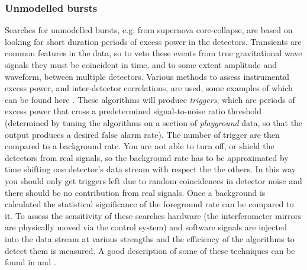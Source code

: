 \documentclass{article}
\begin{document}
\subsubsection{Unmodelled bursts}\label{subsubsection:unmodelled}
Searches for unmodelled bursts, e.g. from supernova core-collapse, are based on
looking for short duration periods of excess power in the detectors. Transients
are common features in the data, so to veto these events from true
gravitational wave signals they must be coincident in time, and to some extent
amplitude and waveform, between multiple detectors. Various methods to assess
instrumental excess power, and inter-detector correlations, are used, some
examples of which can be found here \cite{Klimenko:2004, Anderson:2001,
Searle:2008, McNabb:2004, Cadonati:2004, Chatterji:2004, Chatterji:2006}. These
algorithms will produce {\it triggers}, which are periods of excess power that
cross a predetermined signal-to-noise ratio threshold (determined by tuning the
algorithms on a section of {\it playground} data, so that the output produces a
desired false alarm rate). The number of trigger are then compared to a
background rate. You are not able to turn off, or shield the detectors from real
signals, so the background rate has to be approximated by time shifting one
detector's data stream with respect the the others. In this way you should only
get triggers left due to random coincidences in detector noise and there should
be no contribution from real signals. Once a background is calculated the
statistical significance of the foreground rate can be compared to it. To assess
the sensitivity of these searches hardware (the interferometer mirrors are
physically moved via the control system) and software signals are injected into
the data stream at various strengths and the efficiency of the algorithms to
detect them is measured. A good description of some of these techniques can be
found in \cite{Abbott:2004b} and \cite{Abbott:2006a}.
\end{document}
